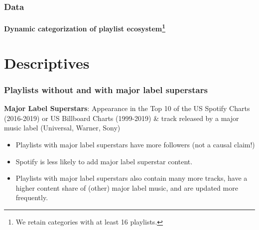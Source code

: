 \documentclass[8pt]{beamer}
\begin{document}
\begin{frame}[label=shortversion]

\frametitle{Data}
\framesubtitle{Dynamic categorization of playlist ecosystem\footnote{We retain categories with at least 16 playlists.}}




\end{frame}


\section{Descriptives}


\begin{frame}

\frametitle{Playlists without and with major label superstars}

\vspace{.2cm}
\textbf{Major Label Superstars}: Appearance in the Top 10 of the US Spotify Charts (2016-2019) or US Billboard Charts (1999-2019) \& track released by a major music label (Universal, Warner, Sony)



\begin{itemize}
	\item Playlists with major label superstars have more followers (not a causal claim!)
	\item Spotify is less likely to add major label superstar content.
    \item Playlists with major label superstars also contain many more tracks, have a higher content share of (other) major label music, and are updated more frequently.
\end{itemize}

\end{frame}
\end{document}
